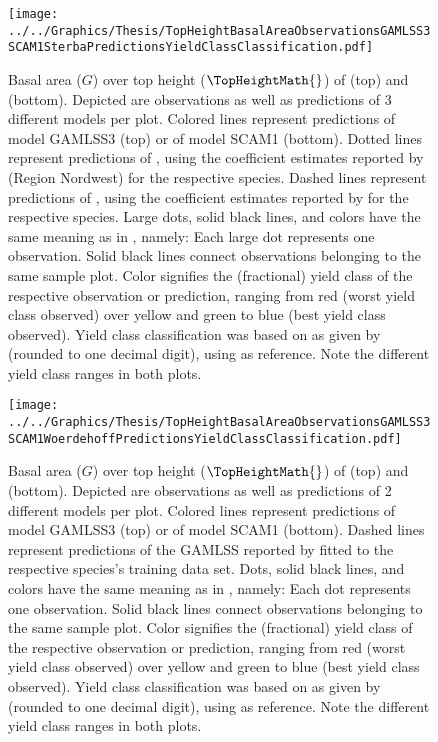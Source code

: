 \begin{figure}[h]
  \centering
  \texttt{[image: ../../Graphics/Thesis/TopHeightBasalAreaObservationsGAMLSS3SCAM1SterbaPredictionsYieldClassClassification.pdf]}
  \caption{Basal area (\(G\)) over top height (\(\TopHeightMath{}\)) of \Beech{} (top) and \Spruce{} (bottom). Depicted are observations as well as predictions of 3 different models per plot.  Colored lines represent predictions of model GAMLSS3 (top) or of model SCAM1 (bottom).  Dotted lines represent predictions of , using the coefficient estimates reported by \textcite{Doebbeler2004} (Region Nordwest) for the respective species.  Dashed lines represent predictions of , using the coefficient estimates reported by \textcite{Woerdehoff2016} for the respective species.  Large dots, solid black lines, and colors have the same meaning as in , namely:  Each large dot represents one observation.  Solid black lines connect observations belonging to the same sample plot.  Color signifies the (fractional) yield class of the respective observation or prediction, ranging from red (worst yield class observed) over yellow and green to blue (best yield class observed).  Yield class classification was based on \ProductivityIndexText{} as given by  (rounded to one decimal digit), using  as reference.  Note the different yield class ranges in both plots.}
  \label{fig:TopHeightBasalAreaObservationsGAMLSS3SCAM1SterbaPredictionsYieldClassClassification}
\end{figure}

\begin{figure}[h]
  \centering
  \texttt{[image: ../../Graphics/Thesis/TopHeightBasalAreaObservationsGAMLSS3SCAM1WoerdehoffPredictionsYieldClassClassification.pdf]}
  \caption{Basal area (\(G\)) over top height (\(\TopHeightMath{}\)) of \Beech{} (top) and \Spruce{} (bottom). Depicted are observations as well as predictions of 2 different models per plot.  Colored lines represent predictions of model GAMLSS3 (top) or of model SCAM1 (bottom).  Dashed lines represent predictions of the GAMLSS reported by \textcite{Woerdehoff2016} fitted to the respective species’s training data set.  Dots, solid black lines, and colors have the same meaning as in , namely:  Each dot represents one observation.  Solid black lines connect observations belonging to the same sample plot.  Color signifies the (fractional) yield class of the respective observation or prediction, ranging from red (worst yield class observed) over yellow and green to blue (best yield class observed).  Yield class classification was based on \ProductivityIndexText{} as given by  (rounded to one decimal digit), using  as reference.  Note the different yield class ranges in both plots.}
  \label{fig:TopHeightBasalAreaObservationsGAMLSS3SCAM1WoerdehoffPredictionsYieldClassClassification}
\end{figure}

